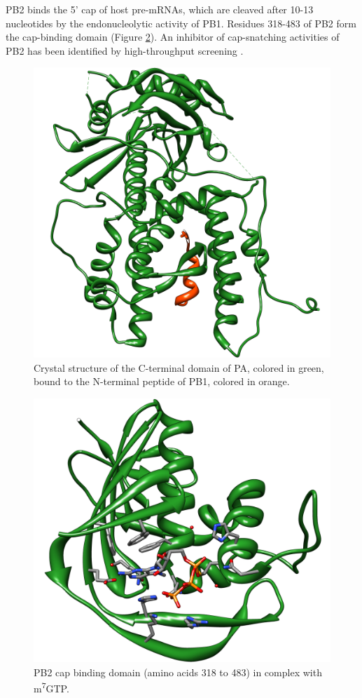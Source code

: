 PB2 binds the 5' cap of host pre-mRNAs, which are cleaved after 10-13 nucleotides by the endonucleolytic activity of PB1. Residues 318-483 of PB2 form the cap-binding domain (Figure \ref{influenza:2VQZ}). An inhibitor of cap-snatching activities of PB2 has been identified by high-throughput screening \citep{1236}.

\begin{figure}
\centering
\includegraphics[width=\linewidth]{../influenza/2ZNL.png}
\caption{Crystal structure of the C-terminal domain of PA, colored in green, bound to the N-terminal peptide of PB1, colored in orange.}
\label{influenza:2ZNL}
\end{figure}

\begin{figure}
\centering
\includegraphics[width=\linewidth]{../influenza/2VQZ.png}
\caption{PB2 cap binding domain (amino acids 318 to 483) in complex with m\textsuperscript{7}GTP.}
\label{influenza:2VQZ}
\end{figure}

